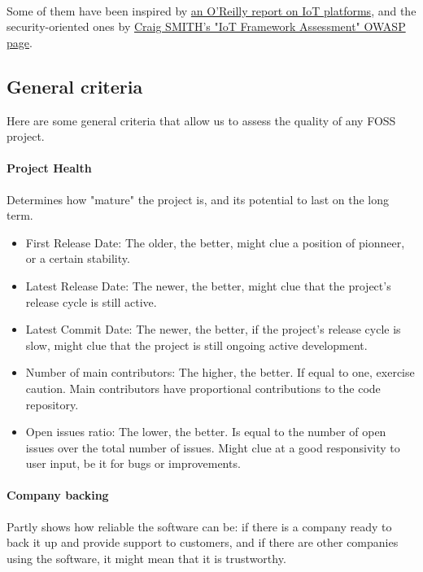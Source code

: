 \documentclass{article}
\begin{document}
\paragraph{} Some of them have been inspired by \href{https://www.thingworx.com/wp-content/uploads/WP_oreilly-media_evaluating-and-choosing-an-iot-platform_978-1-491-95203-0_EN.pdf}{an O'Reilly report on IoT platforms}, and the security-oriented ones by \href{https://www.owasp.org/index.php/IoT_Framework_Assessment}{Craig SMITH's "IoT Framework Assessment" OWASP page}.

\subsection{General criteria}

Here are some general criteria that allow us to assess the quality of any FOSS project.

\paragraph{Project Health} Determines how "mature" the project is, and its potential to last on the long term.

\begin{itemize}
\item First Release Date: The older, the better, might clue a position of pionneer, or a certain stability.
\item Latest Release Date: The newer, the better, might clue that the project's release cycle is still active.
\item Latest Commit Date: The newer, the better, if the project's release cycle is slow, might clue that the project is still ongoing active development.
\item Number of main contributors: The higher, the better. If equal to one, exercise caution. Main contributors have proportional contributions to the code repository.
\item Open issues ratio: The lower, the better. Is equal to the number of open issues over the total number of issues. Might clue at a good responsivity to user input, be it for bugs or improvements.
\end{itemize}

\paragraph{Company backing} Partly shows how reliable the software can be: if there is a company ready to back it up and provide support to customers, and if there are other companies using the software, it might mean that it is trustworthy.
\end{document}
